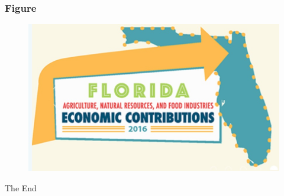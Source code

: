 \documentclass[aspectratio=169,xcolor=dvipsnames]{beamer}
\begin{document}
\begin{frame}
    \frametitle{Figure}

    \begin{figure}
        \includegraphics[scale=.6]{resources/images/fig1}
    \end{figure}
\end{frame}


\begin{frame}
    \Huge{\centerline{The End}}
\end{frame}

\end{document}
